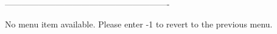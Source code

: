  
 
 
 
 
 
 
 
----------------------------------------------------------
 
No menu item available.
Please enter -1 to revert
to the previous menu.
 
 
 
 
 
 
 
 
 
 
 
 
 
 
 
 
 
 
 
 
 
 
 
 
 
 
 
 
 
 
 
 
 
 
 
 
 
 
 
 
 
 
 
 
 
 
 
 
 
